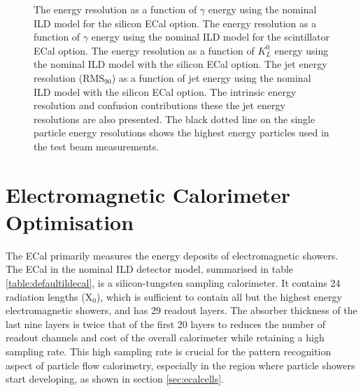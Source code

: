 \begin{figure}
\caption[\protect{} The energy resolution as a function of $\gamma$ energy using the nominal ILD model for the silicon ECal option.  \protect{} The energy resolution as a function of $\gamma$ energy using the nominal ILD model for the scintillator ECal option.  \protect{} The energy resolution as a function of $K^{0}_{L}$ energy using the nominal ILD model with the silicon ECal option.  \protect{} The jet energy resolution ($\text{RMS}_{90}$) as a function of jet energy using the nominal ILD model with the silicon ECal option.  The intrinsic energy resolution and confusion contributions these the jet energy resolutions are also presented.  The black dotted line on the single particle energy resolutions shows the highest energy particles used in the test beam measurements.]{\protect{} The energy resolution as a function of $\gamma$ energy using the nominal ILD model for the silicon ECal option.  \protect{} The energy resolution as a function of $\gamma$ energy using the nominal ILD model for the scintillator ECal option.  \protect{} The energy resolution as a function of $K^{0}_{L}$ energy using the nominal ILD model with the silicon ECal option.  \protect{} The jet energy resolution ($\text{RMS}_{90}$) as a function of jet energy using the nominal ILD model with the silicon ECal option.  The intrinsic energy resolution and confusion contributions these the jet energy resolutions are also presented.  The black dotted line on the single particle energy resolutions shows the highest energy particles used in the test beam measurements.}
\label{fig:nominalres}
\end{figure}


\section{Electromagnetic Calorimeter Optimisation}
\label{sec:ecal}
The ECal primarily measures the energy deposits of electromagnetic showers.  The ECal in the nominal ILD detector model, summarised in table \ref{table:defaultildecal}, is a silicon-tungsten sampling calorimeter.  It contains 24 radiation lengths ($\text{X}_{0}$), which is sufficient to contain all but the highest energy electromagnetic showers, and has 29 readout layers.  The absorber thickness of the last nine layers is twice that of the first 20 layers to reduces the number of readout channels and cost of the overall calorimeter while retaining a high sampling rate.  This high sampling rate is crucial for the pattern recognition aspect of particle flow calorimetry, especially in the region where particle showers start developing, as shown in section \ref{sec:ecalcells}.  

